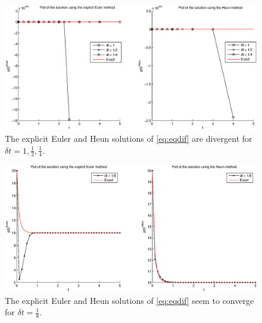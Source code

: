 \documentclass[a4paper,10pt]{article}
\begin{document}
\begin{figure}[H]%
\centering
\includegraphics[width=1\columnwidth]{EuHeGraph.eps}%
\caption{The explicit Euler and Heun solutions of \eqref{eq:eqdif} are divergent for $\delta t = 1,\frac{1}{2},\frac{1}{4}$.}%
\label{EuHeFig1}%
\end{figure}

\begin{figure}[H]%
\centering
\includegraphics[width=1\columnwidth]{EuHeGraph2.eps}%
\caption{The explicit Euler and Heun solutions of \eqref{eq:eqdif} seem to converge for $\delta t = \frac{1}{8}$.}%
\label{EuHeFig2}%
\end{figure}
\end{document}
